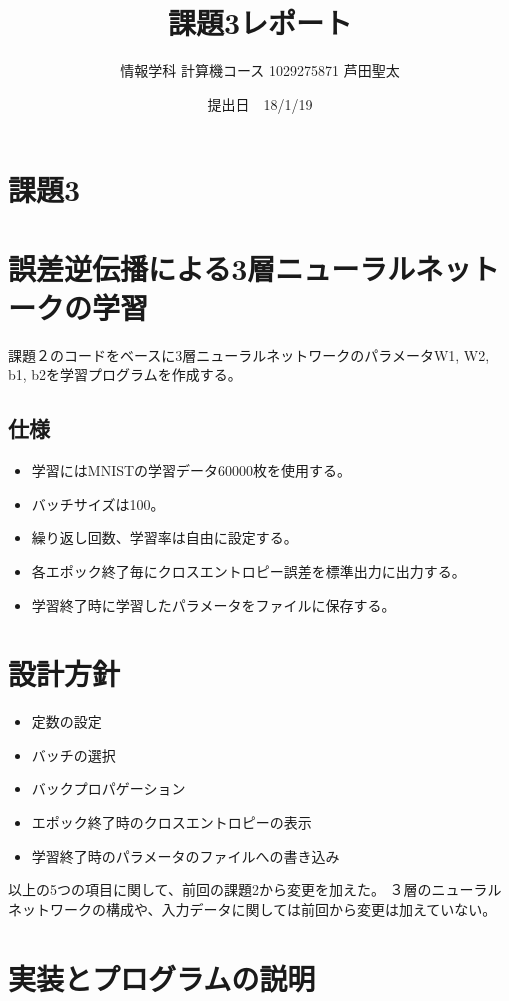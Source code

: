 \documentclass{ujarticle}
\title {課題3レポート}
\author{情報学科 計算機コース 1029275871 芦田聖太}
\date{提出日　18/1/19}
\begin{document}
\begin{titlepage}
\maketitle
\thispagestyle{empty}
\end{titlepage}



\section*{課題3}
\section{誤差逆伝播による3層ニューラルネットークの学習}
課題２のコードをベースに3層ニューラルネットワークのパラメータW1, W2, b1, b2を学習プログラムを作成する。
\subsection*{仕様}
\begin{itemize}
\item 学習にはMNISTの学習データ60000枚を使用する。
\item バッチサイズは100。
\item 繰り返し回数、学習率は自由に設定する。
\item 各エポック終了毎にクロスエントロピー誤差を標準出力に出力する。
\item 学習終了時に学習したパラメータをファイルに保存する。
\end{itemize}


\section{設計方針}
\begin{itemize}
\item 定数の設定
\item バッチの選択
\item バックプロパゲーション
\item エポック終了時のクロスエントロピーの表示
\item 学習終了時のパラメータのファイルへの書き込み
\end{itemize}
以上の5つの項目に関して、前回の課題2から変更を加えた。
３層のニューラルネットワークの構成や、入力データに関しては前回から変更は加えていない。

\section{実装とプログラムの説明}
\end{document}

